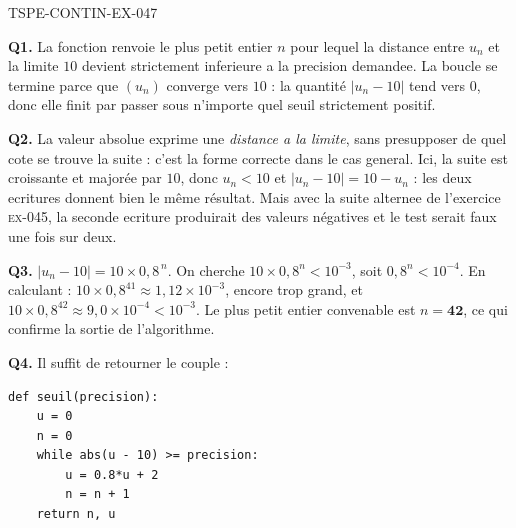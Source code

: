 \begin{corrige}{TSPE-CONTIN-EX-047}

\textbf{Q1.} La fonction renvoie le plus petit entier $n$ pour lequel la distance entre $u_n$ et la limite $10$ devient strictement inferieure a la precision demandee. La boucle se termine parce que $(u_n)$ converge vers $10$ : la quantité $\left|u_n - 10\right|$ tend vers $0$, donc elle finit par passer sous n'importe quel seuil strictement positif.

\textbf{Q2.} La valeur absolue exprime une \emph{distance a la limite}, sans presupposer de quel cote se trouve la suite : c'est la forme correcte dans le cas general. Ici, la suite est croissante et majorée par $10$, donc $u_n < 10$ et $\left|u_n - 10\right| = 10 - u_n$ : les deux ecritures donnent bien le même résultat. Mais avec la suite alternee de l'exercice \textsc{ex-045}, la seconde ecriture produirait des valeurs négatives et le test serait faux une fois sur deux.

\textbf{Q3.} $\left|u_n - 10\right| = 10 \times 0{,}8^{\,n}$. On cherche $10 \times 0{,}8^n < 10^{-3}$, soit $0{,}8^n < 10^{-4}$. En calculant : $10 \times 0{,}8^{41} \approx 1{,}12 \times 10^{-3}$, encore trop grand, et $10 \times 0{,}8^{42} \approx 9{,}0 \times 10^{-4} < 10^{-3}$. Le plus petit entier convenable est $n = \mathbf{42}$, ce qui confirme la sortie de l'algorithme.

\textbf{Q4.} Il suffit de retourner le couple :
\begin{center}
\begin{minipage}{0.8\linewidth}
\begin{verbatim}
def seuil(precision):
    u = 0
    n = 0
    while abs(u - 10) >= precision:
        u = 0.8*u + 2
        n = n + 1
    return n, u
\end{verbatim}
\end{minipage}
\end{center}


\end{corrige}
